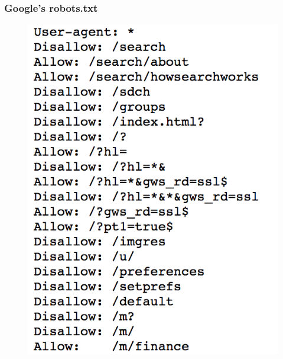 
\setcounter{page}{1}

\begin{frame}
    \frametitle{Google's robots.txt}
    \label{robots}
\begin{figure}[htb]
\includegraphics[scale=0.27,left]{img/figures/google_robots}
\end{figure}
\vspace{-40pt}
\begin{flushright}
\hyperlink{manners}{}
\end{flushright}
\end{frame}

